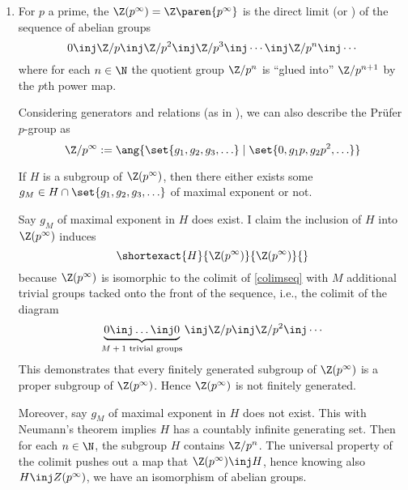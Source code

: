 \documentclass[onesided]{ccg-pset}
\author{Colton Grainger}
\date{\today}
\begin{document}
\maketitle

\begin{enumerate}



\item 
For $p$ a prime, the  $\Z(p^\infty) = \Z\paren{p^{\infty}}$
is the direct limit (or ) of the sequence of abelian groups
\begin{equation}
\label{colimseq}
0 \inj \Z/p \inj \Z/p^2  \inj \Z/p^3 \inj \cdots \inj \Z/p^n \inj \cdots
\end{equation}
where for each $n \in \N$ the quotient group $\Z/p^n$ is ``glued into'' $\Z/p^{n+1}$ by the $p$th power map.

Considering generators and relations (as in \cite{Rie17}), we can also describe the Prüfer $p$-group as
\begin{equation*}
    \Z/p^\infty := \ang{\set{g_1, g_2, g_3, \ldots} \mid \set{0, g_1p, g_2p^2, \ldots} }
\end{equation*}

If $H$ is a subgroup of $\Z(p^{\infty})$, then there either exists some $g_M \in H \cap \set{g_1, g_2, g_3, \ldots}$ of maximal exponent or not. 

Say $g_M$ of maximal exponent in $H$ does exist. I claim the inclusion of $H$ into $\Z(p^\infty)$ induces
\begin{equation*}
    \shortexact{H}{\Z(p^\infty)}{\Z(p^\infty)}{}
\end{equation*}
because $\Z(p^\infty)$ is isomorphic to the colimit of \eqref{colimseq} with $M$ additional trivial groups tacked onto the front of the sequence, i.e., the colimit of the diagram
\begin{equation}
\label{quotientedcolim}
    \underbrace{0 \inj \ldots \inj 0}_\text{$M+1$ trivial groups} \inj \Z/p \inj \Z/p^2 \inj \cdots
\end{equation}
This demonstrates that every finitely generated subgroup of $\Z(p^\infty)$ is a proper subgroup of $\Z(p^\infty)$. Hence $\Z(p^\infty)$ is not finitely generated.

Moreover, say $g_M$ of maximal exponent in $H$ does not exist. This with Neumann's theorem implies $H$ has a countably infinite generating set. Then for each $n \in \N$, the subgroup $H$ contains $\Z/p^n$. The universal property of the colimit pushes out a map that $\Z(p^\infty) \inj H$, hence knowing also $H \inj Z(p^\infty)$, we have an isomorphism of abelian groups.


\end{enumerate}
\end{document}
